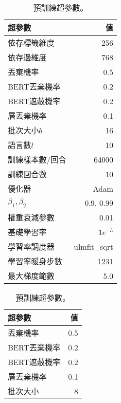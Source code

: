 \begin{table}[htbp]
    \centering
    \begin{subtable}[t]{.4\textwidth}
        \begin{tabular}[t]{@{}lr@{}}
        \toprule
        超參數 & 值 \\
        \midrule
            依存標籤維度         & 256 \\
            依存邊維度           & 768 \\
            丟棄機率            & 0.5 \\
            BERT丟棄機率        & 0.2 \\
            BERT遮蔽機率        & 0.2 \\
            層丟棄機率          & 0.1 \\
            批次大小$b$         & 16 \\
            語言數$l$           & 10 \\
            訓練樣本數/回合        & 64000 \\
            訓練回合數          & 10 \\
            優化器              & Adam \\
            $\beta_1,\beta_2$  & 0.9, 0.99 \\
            權重衰減參數         & 0.01 \\
            基礎學習率          & $1e^{-3}$ \\
            學習率調度器        & ulmfit\_sqrt \\
            學習率暖身步數       & 1231 \\
            最大梯度範數        & 5.0 \\
        \bottomrule
        \end{tabular}
        \caption{
            預訓練超參數。
        }
        \label{tab:pretrain_hparams}
    \end{subtable}
    \begin{subtable}[t]{.4\textwidth}
        \begin{tabular}[t]{@{}lr@{}}
        \toprule
        超參數 & 值 \\
        \midrule
            丟棄機率            & 0.5 \\
            BERT丟棄機率        & 0.2 \\
            BERT遮蔽機率        & 0.2 \\
            層丟棄機率          & 0.1 \\
            批次大小            & 8 \\

\end{tabular}
\end{subtable}
\end{table}
